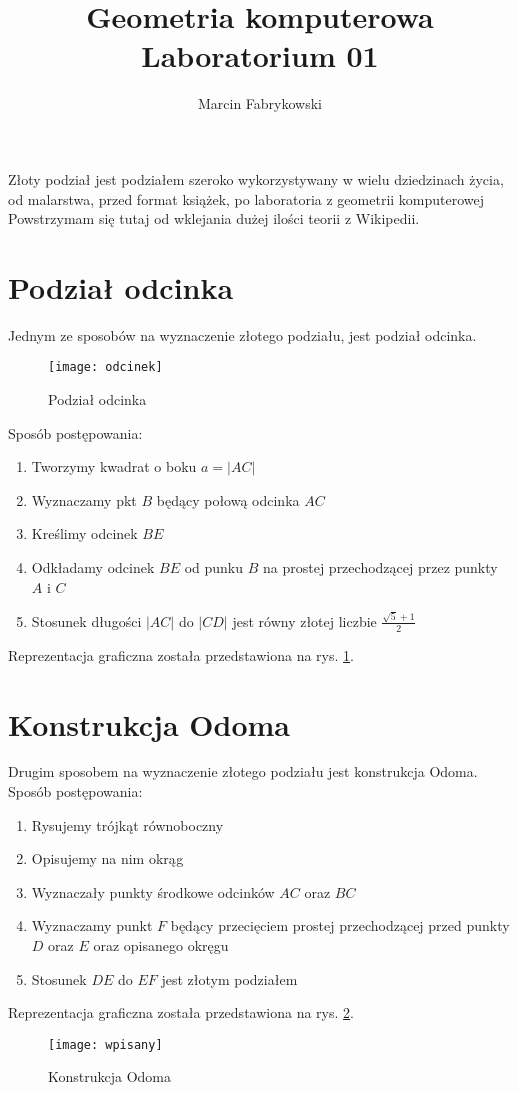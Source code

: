 \documentclass[a4paper, 12pt]{article}
\author{Marcin Fabrykowski}
\title{Geometria komputerowa\\Laboratorium 01}
\begin{document}
\maketitle
\newpage
Złoty podział jest podziałem szeroko wykorzystywany w wielu dziedzinach życia, od malarstwa, przed format książek, po laboratoria z geometrii komputerowej\\
Powstrzymam się tutaj od wklejania dużej ilości teorii z Wikipedii.\\


\section{Podział odcinka}
Jednym ze sposobów na wyznaczenie złotego podziału, jest podział odcinka.\\
\begin{figure}
\texttt{[image: odcinek]}
\caption{Podział odcinka}
\label{fig:odcinek}
\end{figure}
Sposób postępowania:
\begin{enumerate}
\item Tworzymy kwadrat o boku $a = |AC|$
\item Wyznaczamy pkt $B$ będący połową odcinka $AC$
\item Kreślimy odcinek $BE$
\item Odkładamy odcinek $BE$ od punku $B$ na prostej przechodzącej przez punkty $A$ i $C$
\item Stosunek długości $|AC|$ do $|CD|$ jest równy złotej liczbie $\frac{\sqrt{5} + 1}{2}$
\end{enumerate}
Reprezentacja graficzna została przedstawiona na rys. \ref{fig:odcinek}.

\section{Konstrukcja Odoma}
Drugim sposobem na wyznaczenie złotego podziału jest konstrukcja Odoma.
Sposób postępowania:
\begin{enumerate}
\item Rysujemy trójkąt równoboczny
\item Opisujemy na nim okrąg
\item Wyznaczały punkty środkowe odcinków $AC$ oraz $BC$
\item Wyznaczamy punkt $F$ będący przecięciem prostej przechodzącej przed punkty $D$ oraz $E$ oraz opisanego okręgu
\item Stosunek $DE$ do $EF$ jest złotym podziałem
\end{enumerate}
Reprezentacja graficzna została przedstawiona na rys. \ref{fig:wpisany}.

\begin{figure}
\texttt{[image: wpisany]}
\caption{Konstrukcja Odoma}
\label{fig:wpisany}
\end{figure}
\end{document}
